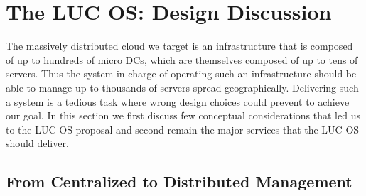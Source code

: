 \section{The LUC OS: Design Discussion}
\label{sec:design}

The massively distributed cloud we target is an infrastructure that is composed of up to
hundreds of micro DCs, which are themselves composed of up to tens of servers. Thus the
system in charge of operating such an infrastructure should be able to manage up to
thousands of servers spread geographically. Delivering such a system is a tedious task
where wrong design choices could prevent to achieve our goal.  In this section we first
discuss few conceptual considerations that led us to the LUC OS proposal and second remain
the major services that the LUC OS should deliver.

\subsection{From Centralized to Distributed Management}
\label{subsec:design-arg}




